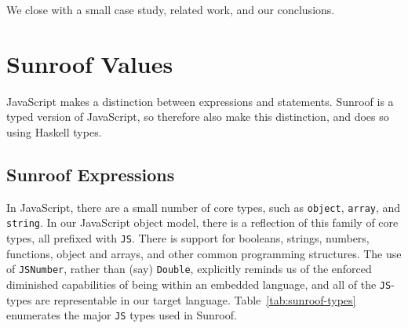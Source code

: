 \documentclass{llncs}
\newcommand{\Src}[1]{{\tt{#1}}}
\begin{document}
We close with a small case study, related work, and our conclusions.



\section{Sunroof Values} %
\label{sec:object-model}

JavaScript makes a distinction between expressions and statements.
Sunroof is a typed version of JavaScript, so therefore also
make this distinction, and does so using Haskell types.

\subsection{Sunroof Expressions}

In JavaScript, there are a small number of core types, such as \Src{object}, \Src{array}, and \Src{string}.
In our JavaScript object model, there is a reflection of this family of core types, all prefixed with \Src{JS}.
There is support for booleans, strings, numbers, functions,
object and arrays, and other common programming structures.
The use of \Src{JSNumber}, rather than (say) \Src{Double},
explicitly reminds us of the enforced diminished capabilities of
being within an embedded language,
and all of the \Src{JS}-types are representable in our target language.
Table~\ref{tab:sunroof-types} enumerates the major \Src{JS} types used in Sunroof.
\end{document}
